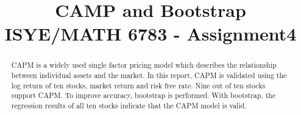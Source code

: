 \documentclass[11pt, conference]{IEEEtran}
\begin{document}
%
\title{\huge CAMP and Bootstrap \\ {\large ISYE/MATH 6783 - Assignment4}}


\author{
}







\maketitle

\begin{abstract}
CAPM is a widely used single factor pricing model which describes the relationship between individual assets and the market. In this report, CAPM is validated using the log return of ten stocks, market return and risk free rate. Nine out of ten stocks support CAPM. To improve accuracy, bootstrap is performed. With bootstrap, the regression results of all ten stocks indicate that the CAPM model is valid. 
\end{abstract}



%
\IEEEpeerreviewmaketitle
\end{document}
